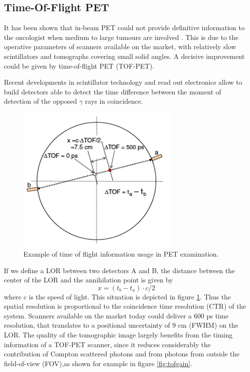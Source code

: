 \subsection{Time-Of-Flight PET}

It has been shown that in-beam PET could not provide definitive information to the oncologist when medium to large tumours are involved \cite{Fiedler2006}. This is due to the operative parameters of scanners available on the market, with relatively slow scintillators and tomographs covering small solid angles. A decisive improvement could be given by time-of-flight PET (TOF-PET).

Recent developments in scintillator technology and read out electronics allow to build detectors able to detect the time difference between the moment of detection of the opposed $\gamma$ rays in coincidence. 
\begin{figure}
\centering  
\includegraphics[width=8cm]{Pictures/Chapter_1/TOF}
\caption[TOF-PET schematics]{Example of time of flight information usage in PET examination.}
\label{fig:TOF}
\end{figure}
If we define a LOR between two detectors A and B, the distance between the center of the LOR and the annihilation point is given by
\begin{equation}
x = (t_{b}-t_{a} ) \cdot c/2
\end{equation}
where c is the speed of light. This situation is depicted in figure \ref{fig:TOF}.
Thus the spatial resolution is proportional to the coincidence time resolution (CTR) of the system.
Scanners available on the market today could deliver a 600 ps time resolution, that translates to a positional uncertainty of 9 cm (FWHM) on the LOR.
The quality of the tomographic image largely benefits from the timing information of a TOF-PET scanner, since it reduces considerably  the contribution of Compton scattered photons and from photons from outside the field-of-view (FOV),as shown for example in figure \ref{fig:tofgain}.
